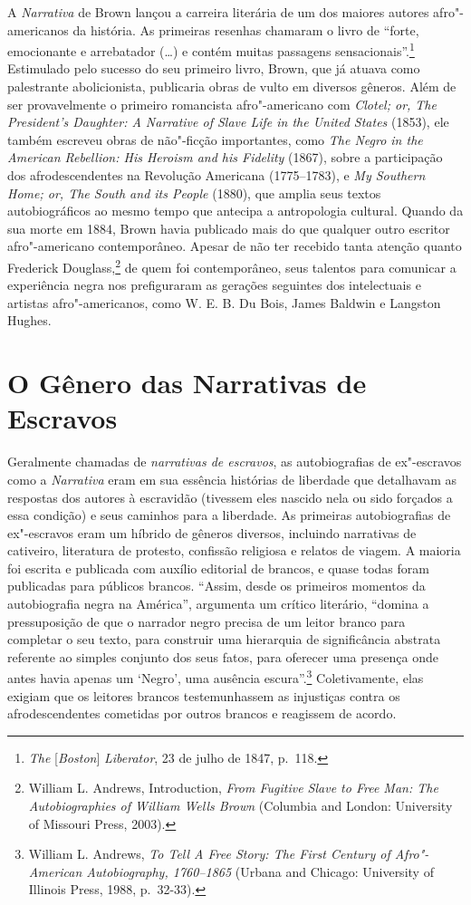 A \emph{Narrativa} de Brown
lançou a carreira literária de um dos maiores autores afro"-americanos da
história. As primeiras resenhas chamaram o livro de ``forte, emocionante
e arrebatador (\ldots{}) e contém muitas passagens sensacionais''.\footnote{\emph{The} {[}\emph{Boston}{]} \emph{Liberator}, 23 de julho de 1847, p.~118.} Estimulado
pelo sucesso do seu primeiro livro, Brown, que já atuava como
palestrante abolicionista, publicaria obras de vulto em diversos
gêneros. Além de ser provavelmente o primeiro romancista afro"-americano
com \emph{Clotel; or, The President's Daughter: A Narrative of Slave
Life in the United States} (1853), ele também escreveu obras de
não"-ficção importantes, como \emph{The Negro in the American Rebellion:
His Heroism and his Fidelity} (1867), sobre a participação dos
afrodescendentes na Revolução Americana (1775--1783), e \emph{My Southern
Home; or, The South and its People} (1880), que amplia seus textos
autobiográficos ao mesmo tempo que antecipa a antropologia cultural.
Quando da sua morte em 1884, Brown havia publicado mais do que qualquer
outro escritor afro"-americano contemporâneo. Apesar de não ter recebido
tanta atenção quanto Frederick Douglass,\footnote{William L. Andrews,
  Introduction, \emph{From Fugitive Slave to Free Man: The
  Autobiographies of William Wells Brown} (Columbia and London:
  University of Missouri Press, 2003).} de quem foi contemporâneo, seus
talentos para comunicar a experiência negra nos  prefiguraram as
gerações seguintes dos intelectuais e artistas afro"-americanos, como W.
E. B. Du Bois, James Baldwin e Langston Hughes.

\section{O Gênero das Narrativas de Escravos}

Geralmente chamadas de \emph{narrativas de escravos}, as autobiografias
de ex"-escravos como a \emph{Narrativa} eram em sua essência histórias de
liberdade que detalhavam as respostas dos autores à escravidão (tivessem
eles nascido nela ou sido forçados a essa condição) e seus caminhos para
a liberdade. As primeiras autobiografias de ex"-escravos eram um híbrido
de gêneros diversos, incluindo narrativas de cativeiro, literatura de
protesto, confissão religiosa e relatos de viagem. A maioria foi escrita
e publicada com auxílio editorial de brancos, e quase todas foram
publicadas para públicos brancos. ``Assim, desde os primeiros momentos
da autobiografia negra na América'', argumenta um crítico literário,
``domina a pressuposição de que o narrador negro precisa de um leitor
branco para completar o seu texto, para construir uma hierarquia de
significância abstrata referente ao simples conjunto dos seus fatos,
para oferecer uma presença onde antes havia apenas um `Negro', uma
ausência escura''.\footnote{William L. Andrews, \emph{To Tell A Free
  Story: The First Century of Afro"-American Autobiography, 1760--1865}
  (Urbana and Chicago: University of Illinois Press, 1988, p.~32-33).}
Coletivamente, elas exigiam que os leitores brancos testemunhassem as
injustiças contra os afrodescendentes cometidas por outros brancos e
reagissem de acordo.

